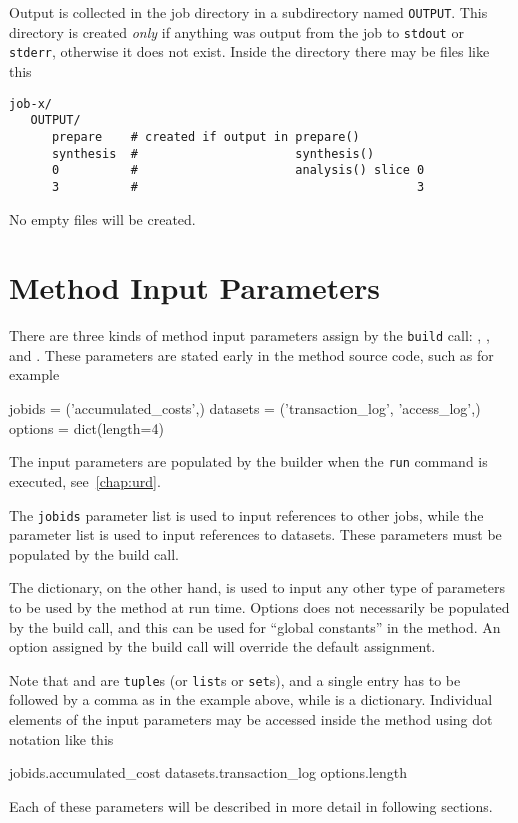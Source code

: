 Output is collected in the job directory in a subdirectory named
\texttt{OUTPUT}.  This directory is created \textsl{only} if anything
was output from the job to \texttt{stdout} or \texttt{stderr},
otherwise it does not exist.  Inside the directory there may be files
like this
\begin{verbatim}
job-x/
   OUTPUT/
      prepare    # created if output in prepare()
      synthesis  #                      synthesis()
      0          #                      analysis() slice 0
      3          #                                       3
\end{verbatim}
No empty files will be created.



\section{Method Input Parameters}
\label{sec:input_params}

There are three kinds of method input parameters assign by
the \texttt{build} call: \jobids, \datasets, and \options.  These
parameters are stated early in the method source code, such as for
example
\begin{python}
jobids = ('accumulated_costs',)
datasets = ('transaction_log', 'access_log',)
options = dict(length=4)
\end{python}
The input parameters are populated by the builder when the
\texttt{run} command is executed, see~\ref{chap:urd}.

The \texttt{jobids} parameter list is used to input references to
other jobs, while the \datasets parameter list is used to input
references to datasets.  These parameters must be populated by the
build call.

The \options dictionary, on the other hand, is used to input any other
type of parameters to be used by the method at run time.  Options does
not necessarily be populated by the build call, and this can be used
for ``global constants'' in the method.  An option assigned by the
build call will override the default assignment.

Note that \jobids and \datasets are \texttt{tuple}s (or \texttt{list}s
or \texttt{set}s), and a single entry has to be followed by a comma as
in the example above, while \options is a dictionary.  Individual
elements of the input parameters may be accessed inside the method
using dot notation like this
\begin{python}
jobids.accumulated_cost
datasets.transaction_log
options.length
\end{python}
Each of these parameters will be described in more detail in following
sections.


